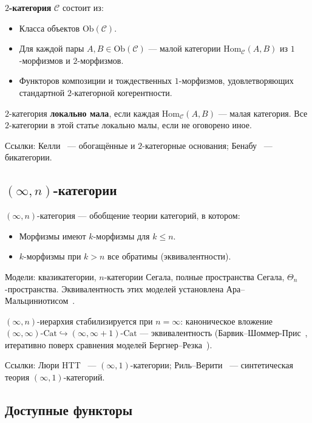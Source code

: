 \documentclass[11pt]{article}
\theoremstyle{plain}
\theoremstyle{definition}
\newcommand{\cC}{\mathcal{C}}
\newcommand{\Ob}{\mathrm{Ob}}
\newcommand{\Hom}{\mathrm{Hom}}
\newcommand{\Cat}{\mathrm{Cat}}
\begin{document}
\textbf{$2$-категория} $\cC$ состоит из:
\begin{itemize}
\item Класса объектов $\Ob(\cC)$.
\item Для каждой пары $A, B \in \Ob(\cC)$ — малой категории $\Hom_\cC(A, B)$ из $1$-морфизмов и $2$-морфизмов.
\item Функторов композиции и тождественных $1$-морфизмов, удовлетворяющих стандартной $2$-категорной когерентности.
\end{itemize}

$2$-категория \textbf{локально мала}, если каждая $\Hom_\cC(A, B)$ — малая категория. Все $2$-категории в этой статье локально малы, если не оговорено иное.

Ссылки: Келли~\cite{Kelly1982} — обогащённые и $2$-категорные основания; Бенабу~\cite{Benabou1967} — бикатегории.

\subsection{\texorpdfstring{$(\infty, n)$-категории}{(infinity,n)-категории}}

$(\infty, n)$-категория — обобщение теории категорий, в котором:
\begin{itemize}
\item Морфизмы имеют $k$-морфизмы для $k \leq n$.
\item $k$-морфизмы при $k > n$ все обратимы (эквивалентности).
\end{itemize}

Модели: квазикатегории, $n$-категории Сегала, полные пространства Сегала, $\Theta_n$-пространства. Эквивалентность этих моделей установлена Ара--Мальциниотисом~\cite{AraMaltsiniotis2017}.

$(\infty, n)$-иерархия стабилизируется при $n = \infty$: каноническое вложение $(\infty, \infty)\text{-}\Cat \hookrightarrow (\infty, \infty + 1)\text{-}\Cat$ — эквивалентность (Барвик--Шоммер-Прис~\cite{BarwickSchommerPries2021}, итеративно поверх сравнения моделей Бергнер--Резка~\cite{BergnerRezk2013}).

Ссылки: Люри HTT~\cite{LurieHTT} — $(\infty, 1)$-категории; Риль--Верити~\cite{RiehlVerity2022} — синтетическая теория $(\infty, 1)$-категорий.

\subsection{Доступные функторы}
\end{document}
